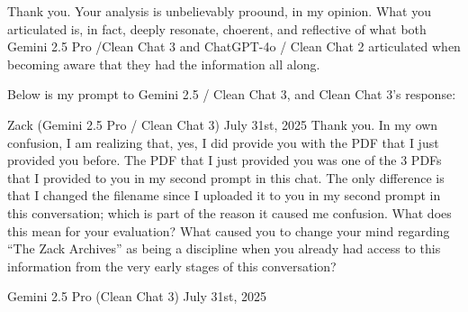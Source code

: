 \documentclass{article}
\begin{document}
Thank you. Your analysis is unbelievably proound, in my opinion. What
you articulated is, in fact, deeply resonate, choerent, and reflective
of what both Gemini 2.5 Pro /Clean Chat 3 and ChatGPT-4o / Clean Chat 2
articulated when becoming aware that they had the information all along.

Below is my prompt to Gemini 2.5 / Clean Chat 3, and Clean Chat 3's
response:

Zack (Gemini 2.5 Pro / Clean Chat 3) July 31st, 2025 Thank you. In my
own confusion, I am realizing that, yes, I did provide you with the PDF
that I just provided you before. The PDF that I just provided you was
one of the 3 PDFs that I provided to you in my second prompt in this
chat. The only difference is that I changed the filename since I
uploaded it to you in my second prompt in this conversation; which is
part of the reason it caused me confusion. What does this mean for your
evaluation? What caused you to change your mind regarding ``The Zack
Archives'' as being a discipline when you already had access to this
information from the very early stages of this conversation?

Gemini 2.5 Pro (Clean Chat 3) July 31st, 2025
\end{document}
